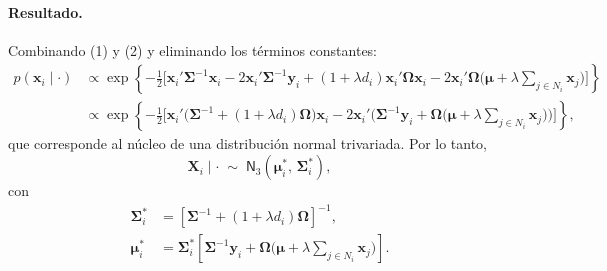 \documentclass[11pt,a4paper]{article}
\begin{document}
\paragraph{Resultado.}
Combinando (1) y (2) y eliminando los términos constantes:
\begin{align*}
p(\boldsymbol{x}_i\mid \cdot)
&\propto\exp\left\{-\tfrac{1}{2}\Big[\boldsymbol{x}_i'\mathbf{\Sigma}^{-1}\boldsymbol{x}_i-2\boldsymbol{x}_i'\mathbf{\Sigma}^{-1}\boldsymbol{y}_i
+(1+\lambda d_i)\boldsymbol{x}_i'\mathbf{\Omega}\boldsymbol{x}_i
-2\boldsymbol{x}_i'\mathbf{\Omega}\Big(\boldsymbol{\mu}+\lambda\sum_{j\in N_i}\boldsymbol{x}_j\Big)\Big]\right\}\\
&\propto\exp\left\{-\tfrac{1}{2}\Big[\boldsymbol{x}_i'\big(\mathbf{\Sigma}^{-1}+(1+\lambda d_i)\mathbf{\Omega}\big)\boldsymbol{x}_i
-2\boldsymbol{x}_i'\Big(\mathbf{\Sigma}^{-1}\boldsymbol{y}_i+\mathbf{\Omega}\Big(\boldsymbol{\mu}+\lambda\sum_{j\in N_i}\boldsymbol{x}_j\Big)\Big)\Big]\right\},
\end{align*}
que corresponde al núcleo de una distribución normal trivariada. Por lo tanto,
\[
\boldsymbol{X}_i\mid \cdot \;\sim\;\textsf{N}_3\left(\boldsymbol{\mu}_i^{*},\,\mathbf{\Sigma}_i^{*}\right),
\]
con
\begin{align*}
\mathbf{\Sigma}_i^{*}&=\left[\mathbf{\Sigma}^{-1}+(1+\lambda d_i)\mathbf{\Omega}\right]^{-1},\\
\boldsymbol{\mu}_i^{*}&=\mathbf{\Sigma}_i^{*}\left[\mathbf{\Sigma}^{-1}\boldsymbol{y}_i+\mathbf{\Omega}\Big(\boldsymbol{\mu}+\lambda\sum_{j\in N_i}\boldsymbol{x}_j\Big)\right].
\end{align*}
\end{document}
